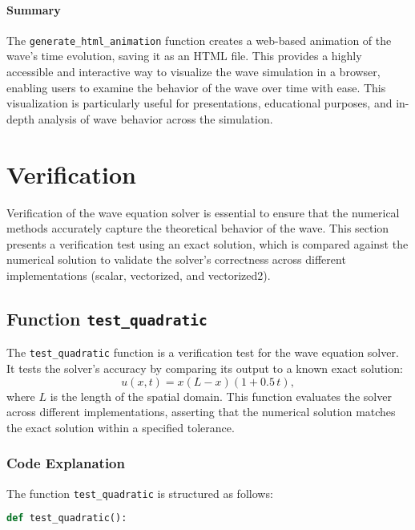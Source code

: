 \documentclass{article}
\begin{document}
			\paragraph{Summary}
			
			The \texttt{generate\_html\_animation} function creates a web-based animation of the wave’s time evolution, saving it as an HTML file. This provides a highly accessible and interactive way to visualize the wave simulation in a browser, enabling users to examine the behavior of the wave over time with ease. This visualization is particularly useful for presentations, educational purposes, and in-depth analysis of wave behavior across the simulation.
		
		
	
	
	
		\newpage	
	\section{Verification}
	
	Verification of the wave equation solver is essential to ensure that the numerical methods accurately capture the theoretical behavior of the wave. This section presents a verification test using an exact solution, which is compared against the numerical solution to validate the solver’s correctness across different implementations (scalar, vectorized, and vectorized2).
	
		\subsection{Function \texttt{test\_quadratic}}
		
			The \texttt{test\_quadratic} function is a verification test for the wave equation solver. It tests the solver’s accuracy by comparing its output to a known exact solution:
			\[
			u(x, t) = x(L - x)(1 + 0.5 \, t),
			\]
			where \( L \) is the length of the spatial domain. This function evaluates the solver across different implementations, asserting that the numerical solution matches the exact solution within a specified tolerance.
			
			\subsubsection{Code Explanation}
			
			The function \texttt{test\_quadratic} is structured as follows:
			
			\begin{lstlisting}[language=Python, caption=Function Definition]
				def test_quadratic():
			\end{lstlisting}
			
\end{document}
